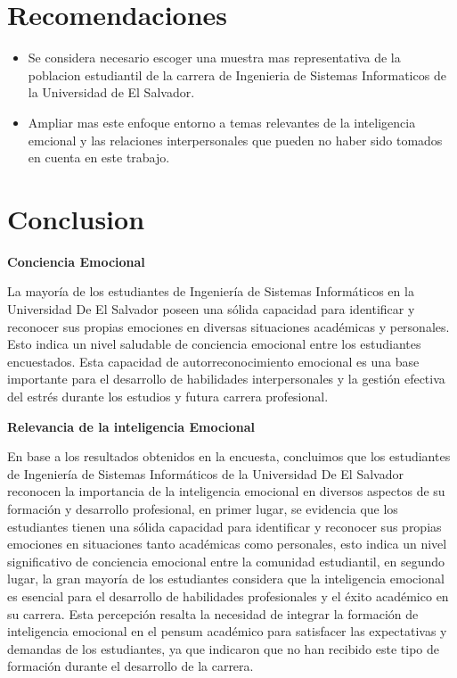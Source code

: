 \documentclass[journal]{IEEEtran}
\begin{document}
\newpage

\section{Recomendaciones}
\begin{itemize}
	\item Se considera necesario escoger una muestra mas representativa de la poblacion estudiantil de la carrera de Ingenieria de Sistemas Informaticos de la Universidad
	de El Salvador.
	\item Ampliar mas este enfoque entorno a temas relevantes de
	la inteligencia emcional y las relaciones interpersonales
	que pueden no haber sido tomados en cuenta en este
	trabajo.
\end{itemize}

\section{Conclusion}
\begin{center}
	\textbf{Conciencia Emocional}
\end{center}
La mayoría de los estudiantes de Ingeniería de Sistemas Informáticos en la Universidad De El Salvador poseen una sólida capacidad para identificar y reconocer sus propias emociones en diversas situaciones académicas y personales. Esto indica un nivel saludable de conciencia emocional entre los estudiantes encuestados. Esta capacidad de autorreconocimiento emocional es una base importante para el desarrollo de habilidades interpersonales y la gestión efectiva del estrés durante los estudios y futura carrera profesional.
\begin{center}
	\textbf{Relevancia de la inteligencia Emocional}
\end{center}
En base a los resultados obtenidos en la encuesta, concluimos que los estudiantes de Ingeniería de Sistemas Informáticos de la Universidad De El Salvador reconocen la importancia de la inteligencia emocional en diversos aspectos de su formación y desarrollo profesional, en primer lugar, se evidencia que los estudiantes tienen una sólida capacidad para identificar y reconocer sus propias emociones en situaciones tanto académicas como personales, esto indica un nivel significativo de conciencia emocional entre la comunidad estudiantil, en segundo lugar, la gran mayoría de los estudiantes considera que la inteligencia emocional es esencial para el desarrollo de habilidades profesionales y el éxito académico en su carrera. Esta percepción resalta la necesidad de integrar la formación de inteligencia emocional en el pensum académico para satisfacer las expectativas y demandas de los estudiantes, ya que indicaron que no han recibido este tipo de formación durante el desarrollo de la carrera.
\end{document}
